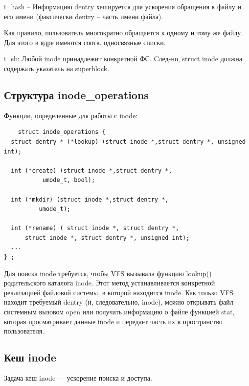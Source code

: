 i\_hash -- Информацию dentry хешируется для ускорения обращения к файлу и его имени (фактически dentry -- часть имени файла).

Как правило, пользователь многократно обращается к одному и тому же файлу. Для этого в ядре имеются соотв. односвязные списки.


i\_sb:  Любой inode принадлежит конкретной ФС. Cлед-но, struct inode должна содержать указатель на superblock.

\subsection{Структура inode\_operations}
Функции, определенные для работы с inode:
\begin{lstlisting}
    struct inode_operations {
  struct dentry * (*lookup) (struct inode *,struct dentry *, unsigned int);
  
  int (*create) (struct inode *,struct dentry *,
           umode_t, bool);

  int (*mkdir) (struct inode *,struct dentry *,
          umode_t);
  
  int (*rename) ( struct inode *, struct dentry *,
      struct inode *, struct dentry *, unsigned int);
  ...
} ;
\end{lstlisting}

Для поиска inode требуется, чтобы VFS вызывала функцию lookup() родительского каталога inode. Этот метод устанавливается конкретной реализацией файловой системы, в которой находится inode. Как только VFS находит требуемый dentry (и, следовательно, inode), можно открывать файл системным вызовом open или получать информацию о файле функцией stat, которая просматривает данные inode и передает часть их в пространство пользователя.


\subsection{Кеш inode}
Задача кеш inode --- ускорение поиска и доступа.

